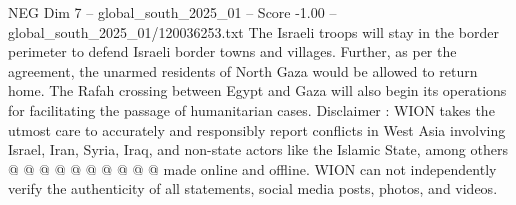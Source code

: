 \begin{textsample}{NEG Dim 7 – global\_south\_2025\_01 – Score -1.00 – global\_south\_2025\_01/120036253.txt}
The Israeli troops will stay in the border perimeter to defend Israeli border towns and villages.
Further, as per the agreement, the unarmed residents of North Gaza would be allowed to return home.
The Rafah crossing between Egypt and Gaza will also begin its operations for facilitating the passage of humanitarian cases.
Disclaimer : WION takes the utmost care to accurately and responsibly report conflicts in West Asia involving Israel, Iran, Syria, Iraq, and non-state actors like the Islamic State, among others @ @ @ @ @ @ @ @ @ @ made online and offline.
WION can not independently verify the authenticity of all statements, social media posts, photos, and videos.

\end{textsample}
